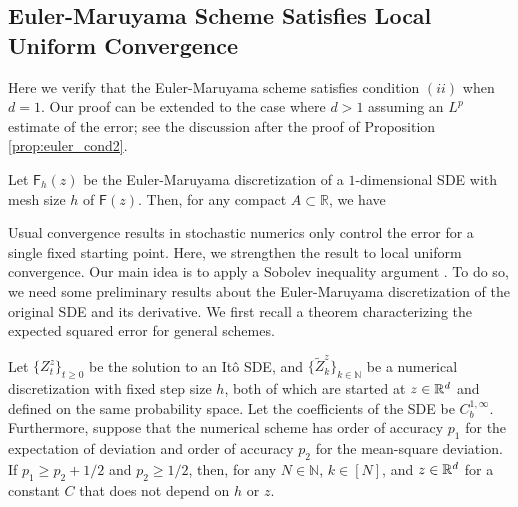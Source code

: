 \documentclass[twoside]{article}
\begin{document}
 \subsection{Euler-Maruyama Scheme Satisfies Local Uniform Convergence}\label{app:euler_cond2}

Here we verify that the Euler-Maruyama scheme satisfies condition $(ii)$ when $d=1$. 
Our proof can be extended to the case where $d > 1$ assuming an $L^p$ estimate of the error; see the discussion after the proof of Proposition \ref{prop:euler_cond2}.

\begin{prop}\label{prop:euler_cond2}
Let $\mathsf{F}_h(z)$ be the Euler-Maruyama discretization of a $1$-dimensional SDE with mesh size $h$ of $\mathsf{F}(z)$. Then, for any compact $A \subset \mathbb{R}$, we have
\end{prop}

Usual convergence results in stochastic numerics only control the error for a single fixed starting point. Here, we strengthen the result to local uniform convergence. Our main idea is to apply a Sobolev inequality argument \cite[Part II]{ocone1989generalized}. To do so, we need some preliminary results about the Euler-Maruyama discretization of the original SDE and its derivative.
We first recall a theorem characterizing the expected squared error for general schemes.

\begin{theo}\label{theo:fundamental_convergence}
Let $\{Z_t^z\}_{t\ge 0}$ be the solution to an It\^o SDE, and $\{\tilde{Z}_k^z\}_{k\in \mathbb{N}}$ be a numerical discretization with fixed step size $h$, both of which are started at $z \in \mathbb{R}^d$ and defined on the same probability space.
Let the coefficients of the SDE be $C_b^{1, \infty}$. Furthermore, suppose that the numerical scheme has order of accuracy $p_1$ for the expectation of deviation and order of accuracy $p_2$ for the mean-square deviation. If $p_1 \ge p_2 + 1/2$ and $p_2 \ge 1/2$, then, for any $N \in \mathbb{N}$, $k \in [N]$, and $z \in \mathbb{R}^d$
for a constant $C$ that does not depend on $h$ or $z$.
\end{theo}
\end{document}
